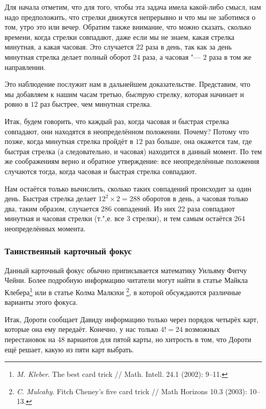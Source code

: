 \documentclass[twoside]{book}
\begin{document}
\medskip

Для начала отметим, что для того, чтобы эта задача имела какой-либо смысл, нам надо предположить, что стрелки движутся непрерывно и что мы не заботимся о том, утро это или вечер.
Обратим также внимание, что можно сказать, сколько времени, когда стрелки совпадают, даже если мы не знаем, какая стрелка минутная, а какая часовая.
Это случается $22$ раза в день, так как за день минутная стрелка делает полный оборот $24$ раза, а часовая "--- $2$ раза в том же направлении.

Это наблюдение послужит нам в дальнейшем доказательстве.
Представим, что мы добавляем к нашим часам третью, \emph{быструю} стрелку, которая начинает  и  ровно в $12$ раз быстрее, чем минутная стрелка.

Итак, будем говорить, что каждый раз, когда часовая и быстрая стрелка совпадают, они находятся в неопределённом положении.
Почему?
Потому что позже, когда минутная стрелка пройдёт в $12$ раз больше, она окажется там, где быстрая стрелка (а следовательно, и часовая) находится в данный момент.
По тем же соображениям верно и обратное утверждение: все неопределённые положения случаются тогда, когда часовая и быстрая стрелка совпадают.

Нам остаётся только вычислить, сколько таких совпадений происходит за один день.
Быстрая стрелка делает $12^2\times 2 = 288$ оборотов в день, а часовая только два, таким образом, случается 286 совпадений.
Из них 22 раза совпадают минутная и часовая стрелки (т.",е. все $3$ стрелки), и тем самым остаётся 264 неопределённых момента. 
\heart

\subsubsection*{Таинственный карточный фокус}%

Данный карточный фокус обычно приписывается математику Уильяму Фитчу Чейни. %
Более подробную информацию читатели могут найти в статье Майкла Клебера\footnote{\emph{M. Kleber}. The best card trick /\!/ {Math. Intell.} 24.1 (2002): 9--11.}
или в статье Колма Малкэхи%
\footnote{\emph{C. Mulcahy}. Fitch Cheney's five card trick /\!/ {Math Horizons} 10.3 (2003): 10--13.}, в которой обсуждаются различные варианты этого фокуса.

\medskip

Итак, Дороти сообщает Давиду информацию только через порядок четырёх карт, которые она ему передаёт.
Конечно, у нас только $4!=24$ возможных перестановок на $48$ вариантов для пятой карты, но хитрость в том, что Дороти ещё решает, какую из пяти карт выбрать.
\end{document}

